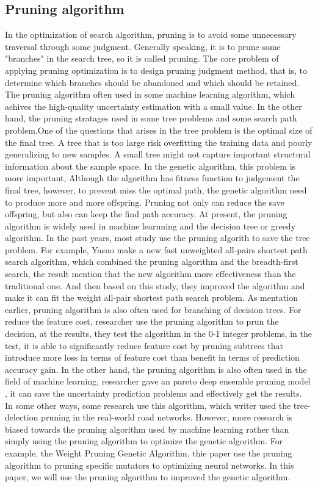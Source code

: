 \documentclass[12pt]{article}
\begin{document}
\subsection{Pruning algorithm}
In the optimization of search algorithm, pruning is to avoid some unnecessary traversal through some judgment. Generally speaking, it is to prune some "branches" in the search tree, so it is called pruning. The core problem of applying pruning optimization is to design pruning judgment method, that is, to determine which branches should be abandoned and which should be retained. The pruning algorithm often used in some machine learning algorithm\cite{Hu2019}, which achives the high-quality uncertainty estimation with a small value. In the other hand, the pruning stratages used in some tree problems and some search path problem.One of the questions that arises in the tree problem is the optimal size of the final tree. A tree that is too large risk overfitting the training data and poorly generalizing to new samples. A small tree might not capture important structural information about the sample space. In the genetic algorithm, this problem is more important, Although the algorithm has fitness function to judgement the final tree, however, to prevent miss the optimal path, the genetic algorithm need to produce more and more offspring. Pruning not only can reduce the save offspring, but also can keep the find path accuracy. 
At present, the pruning algorithm is widely used in machine learnning and the decision tree or greedy algorithm. In the past years, most study use the pruning algorith to save the tree problem. For example, Yasuo\cite{Yamane2019} make a new
fast unweighted all-pairs shortest path search algorithm, which combined the pruning algorithm and the breadth-first search, the result mention that the new algorithm more effectiveness than the traditional one. And then based on this study, they improved the algorithm\cite{Yamane2019a} and make it can fit the weight all-pair shortest path search problem. As mentation earlier, pruning algorithm is also often used for branching of decision trees. For reduce the feature cost\cite{Nan2016}, researcher use the pruning algorithm to prun the decision, at the results, they test the algorithm in the 0-1 integer problems, in the test, it is able to significantly reduce feature cost by pruning subtrees that introduce more loss in terms of feature cost than benefit in terms of prediction accuracy gain.  In the other hand, the pruning algorithm is also often used in the field of machine learning, researcher gave an pareto deep ensemble pruning model\cite{Hu2019} , it can save the uncertainty prediction problems and effectively get the results.  
In some other ways, some research use this algorithm\cite{10.1007/978-3-642-28493-9_10}, which writer used the tree-delection pruning in the real-world road networks. However, more research is biased towards the pruning algorithm used by machine learning rather than simply using the pruning algorithm to optimize the genetic algorithm. For example, the Weight Pruning Genetic Algorithm\cite{Janjic2019}, thie paper use the pruning algorithm to pruning specific mutators to optimizing neural networks. In this paper, we will use the pruning algorithm to improved the genetic algorithm.
\end{document}
